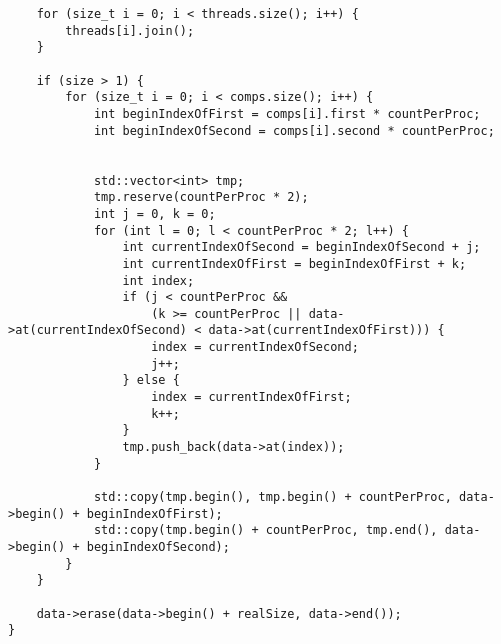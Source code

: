 \documentclass{report}
\begin{document}
\begin{lstlisting}
    for (size_t i = 0; i < threads.size(); i++) {
        threads[i].join();
    }

    if (size > 1) {
        for (size_t i = 0; i < comps.size(); i++) {
            int beginIndexOfFirst = comps[i].first * countPerProc;
            int beginIndexOfSecond = comps[i].second * countPerProc;


            std::vector<int> tmp;
            tmp.reserve(countPerProc * 2);
            int j = 0, k = 0;
            for (int l = 0; l < countPerProc * 2; l++) {
                int currentIndexOfSecond = beginIndexOfSecond + j;
                int currentIndexOfFirst = beginIndexOfFirst + k;
                int index;
                if (j < countPerProc &&
                    (k >= countPerProc || data->at(currentIndexOfSecond) < data->at(currentIndexOfFirst))) {
                    index = currentIndexOfSecond;
                    j++;
                } else {
                    index = currentIndexOfFirst;
                    k++;
                }
                tmp.push_back(data->at(index));
            }

            std::copy(tmp.begin(), tmp.begin() + countPerProc, data->begin() + beginIndexOfFirst);
            std::copy(tmp.begin() + countPerProc, tmp.end(), data->begin() + beginIndexOfSecond);
        }
    }

    data->erase(data->begin() + realSize, data->end());
}
\end{lstlisting}
\end{document}
